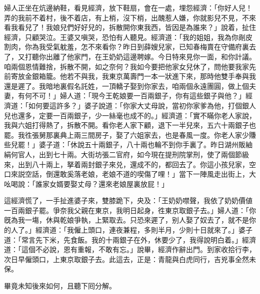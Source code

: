 婦人正坐在炕邊納鞋，看見經濟，放下鞋扇，會在一處，埋怨經濟：「你好人兒！弄的我前不着村，後不着店，有上梢，沒下梢，出醜惹人嫌，你就影兒不見，不來看我看兒了！我娘兒們好好兒的，拆散開你東我西，皆因是為誰來？」說着，扯住經濟，只顧哭泣。王婆又嗔哭，恐怕有人聽見。經濟道：「我的姐姐，我為你剮皮割肉，你為我受氣躭羞，怎不來看你？昨日到薛嫂兒家，已知春梅賣在守備府裏去了，又打聽你出離了他家門，在王奶奶這邊聘嫁。今日特來見你一面，和你計議。咱兩個恩情難捨，拆散不開，如之奈何？我如今要把他家女兒休了，問他要我家先前寄放金銀箱籠。他若不與我，我東京萬壽門一本一狀進下來，那時他雙手奉與我還是遲了。我暗地裏假名託姓，一頂轎子娶到你家去，咱兩個永遠團圓，做上個夫妻，有何不可！」婦人道：「現今王乾娘要一百兩銀子，你有這些銀子與他？」經濟道：「如何要這許多？」婆子說道：「你家大丈母說，當初你家爹為他，打個銀人兒也還多，定要一百兩銀子，少一絲毫也成不的。」經濟道：「實不瞞你老人家說，我與六姐打得熱了，拆散不開。看你老人家下顧，退下一半兒來，五六十兩銀子也罷。我徃張舅那裏典上兩三間房子，娶了六姐家去，也是春風一度。你老人家少賺些兒罷！」婆子道：「休說五十兩銀子，八十兩也輪不到你手裏了。昨日湖州販紬絹何官人，出到七十兩。大街坊張二官府，如今現在提刑院掌刑，使了兩個節級來，出到八十兩上，拏着兩封銀子來兑，還成不的，都回去了。你這小孩兒家，空口來説空話，倒還敢奚落老娘，老娘不道的喫傷了哩！」當下一陣風走出街上，大吆喝說：「誰家女婿要娶丈母？還來老娘屋裏放屁！」

這經濟慌了，一手扯進婆子來，雙膝跪下，央及：「王奶奶噤聲，我依了奶奶價値一百兩銀子罷。爭奈我父親在東京，我明日起身，徃東京取銀子去。」婦人道：「你旣為我一塲，休與乾娘爭執，上緊取去。只恐來遲了，别人娶了奴去了，就不是你的人了。」經濟道：「我僱上頭口，連夜兼程，多則半月，少則十日就來了。」婆子道：「常言先下米，先食飯。我的十兩銀子在外，休要少了，我得說明白着。」經濟道：「這個不必說，恩有重報，不敢有忘。」說畢，經濟作辭出門。到家收拾行李，次日早僱頭口，上東京取銀子去。此這去，正是：青龍與白虎同行，吉兇事全然未保。

畢竟未知後來如何，且聽下囘分解。

